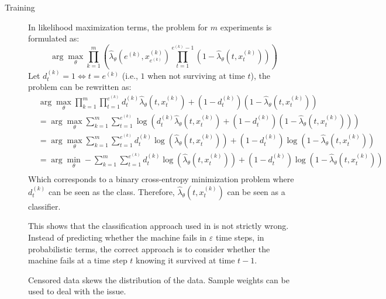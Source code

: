 \begin{description}
            \begin{description}
                \item[Training] 
                    In likelihood maximization terms, the problem for $m$ experiments is formulated as:
                    \[
                        \arg\max_\theta \prod_{k=1}^{m} \left(
                            \hat{\lambda}_\theta(e^{(k)}, x^{(k)}_{e^{(k)}})
                            \prod_{t=1}^{e^{(k)}-1} (1 - \hat{\lambda}_\theta(t, x^{(k)}_{t}))
                        \right)
                    \]
                    Let $d^{(k)}_{t} = 1 \iff t = e^{(k)}$ (i.e., $1$ when not surviving at time $t$), the problem can be rewritten as:
                    \[
                        \begin{split}
                            &\arg\max_\theta \prod_{k=1}^{m} \prod_{t=1}^{e^{(k)}}
                                d^{(k)}_{t} \hat{\lambda}_\theta(t, x^{(k)}_{t}) + (1-d^{(k)}_{t})(1-\hat{\lambda}_\theta(t, x^{(k)}_{t})) \\
                            &= \arg\max_\theta \sum_{k=1}^{m} \sum_{t=1}^{e^{(k)}}
                                \log\left( d^{(k)}_{t} \hat{\lambda}_\theta(t, x^{(k)}_{t}) + (1-d^{(k)}_{t})(1-\hat{\lambda}_\theta(t, x^{(k)}_{t})) \right) \\
                            &= \arg\max_\theta \sum_{k=1}^{m} \sum_{t=1}^{e^{(k)}}
                                d^{(k)}_{t} \log\left(\hat{\lambda}_\theta(t, x^{(k)}_{t})\right) + (1-d^{(k)}_{t}) \log\left(1-\hat{\lambda}_\theta(t, x^{(k)}_{t})\right) \\
                            &= \arg\min_\theta -\sum_{k=1}^{m} \sum_{t=1}^{e^{(k)}}
                                d^{(k)}_{t} \log\left(\hat{\lambda}_\theta(t, x^{(k)}_{t})\right) + (1-d^{(k)}_{t}) \log\left(1-\hat{\lambda}_\theta(t, x^{(k)}_{t})\right) \\
                        \end{split}
                    \]
                    Which corresponds to a binary cross-entropy minimization problem where $d^{(k)}_{t}$ can be seen as the class. Therefore, $\hat{\lambda}_\theta(t, x^{(k)}_{t})$ can be seen as a classifier.

                    \begin{remark}
                        This shows that the classification approach used in  is not strictly wrong. Instead of predicting whether the machine fails in $\varepsilon$ time steps, in probabilistic terms, the correct approach is to consider whether the machine fails at a time step $t$ knowing it survived at time $t-1$.
                    \end{remark}

                    \begin{remark}
                        Censored data skews the distribution of the data. Sample weights can be used to deal with the issue.
                    \end{remark}
            \end{description}
\end{description}

